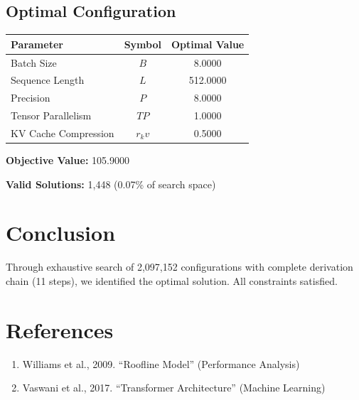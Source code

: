 \documentclass[11pt,a4paper]{article}
\begin{document}
\subsection{Optimal Configuration}

\begin{center}
\begin{tabular}{lcc}
\hline
Parameter & Symbol & Optimal Value \\
\hline
Batch Size & $B$ & 8.0000 \\
Sequence Length & $L$ & 512.0000 \\
Precision & $P$ & 8.0000 \\
Tensor Parallelism & $TP$ & 1.0000 \\
KV Cache Compression & $r_kv$ & 0.5000 \\
\hline
\end{tabular}
\end{center}

\textbf{Objective Value:} 105.9000

\textbf{Valid Solutions:} 1,448 (0.07\% of search space)

\section{Conclusion}

Through exhaustive search of 2,097,152 configurations with complete derivation chain (11 steps), we identified the optimal solution. All constraints satisfied.

\section*{References}

\begin{enumerate}
\item Williams et al., 2009. ``Roofline Model'' (Performance Analysis)
\item Vaswani et al., 2017. ``Transformer Architecture'' (Machine Learning)
\end{enumerate}
\end{document}
